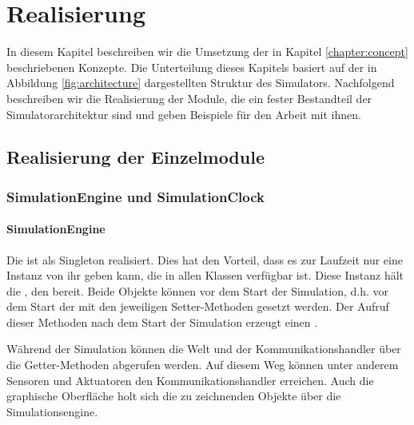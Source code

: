 \chapter{Realisierung}\label{chapter:realization}
In diesem Kapitel beschreiben wir die Umsetzung der in Kapitel \ref{chapter:concept} beschriebenen Konzepte. Die Unterteilung dieses Kapitels basiert auf der in Abbildung \ref{fig:architecture} dargestellten Struktur des Simulators. Nachfolgend beschreiben wir die Realisierung der Module, die ein fester Bestandteil der Simulatorarchitektur sind und geben Beispiele für den Arbeit mit ihnen.
%
\section{Realisierung der Einzelmodule}

\subsection{SimulationEngine und SimulationClock}\label{subsec:real_engine}
\subsubsection{SimulationEngine}
Die  ist als Singleton realisiert. Dies hat den Vorteil, dass es zur Laufzeit nur eine Instanz von ihr geben kann, die in allen Klassen verfügbar ist. Diese Instanz hält die , den  bereit. Beide Objekte können vor dem Start der Simulation, d.h. vor dem Start der  mit den jeweiligen Setter-Methoden gesetzt werden. Der Aufruf dieser Methoden nach dem Start der Simulation erzeugt einen .

Während der Simulation können die Welt und der Kommunikationshandler über die Getter-Methoden abgerufen werden. Auf diesem Weg können unter anderem Sensoren und Aktuatoren den Kommunikationshandler erreichen. Auch die graphische Oberfläche holt sich die zu zeichnenden Objekte über die Simulationsengine.

